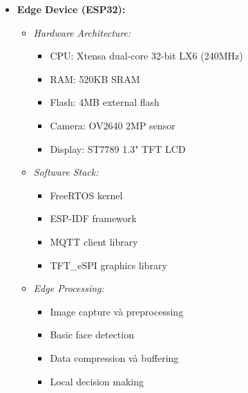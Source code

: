 \begin{itemize}
    \item \textbf{Edge Device (ESP32):}
    \begin{itemize}
        \item \textit{Hardware Architecture:} 
        \begin{itemize}
            \item CPU: Xtensa dual-core 32-bit LX6 (240MHz)
            \item RAM: 520KB SRAM
            \item Flash: 4MB external flash
            \item Camera: OV2640 2MP sensor
            \item Display: ST7789 1.3" TFT LCD
        \end{itemize}
        \item \textit{Software Stack:}
        \begin{itemize}
            \item FreeRTOS kernel
            \item ESP-IDF framework
            \item MQTT client library
            \item TFT_eSPI graphics library
        \end{itemize}
        \item \textit{Edge Processing:}
        \begin{itemize}
            \item Image capture và preprocessing
            \item Basic face detection
            \item Data compression và buffering
            \item Local decision making
        \end{itemize}
    \end{itemize}
    

\end{itemize}
